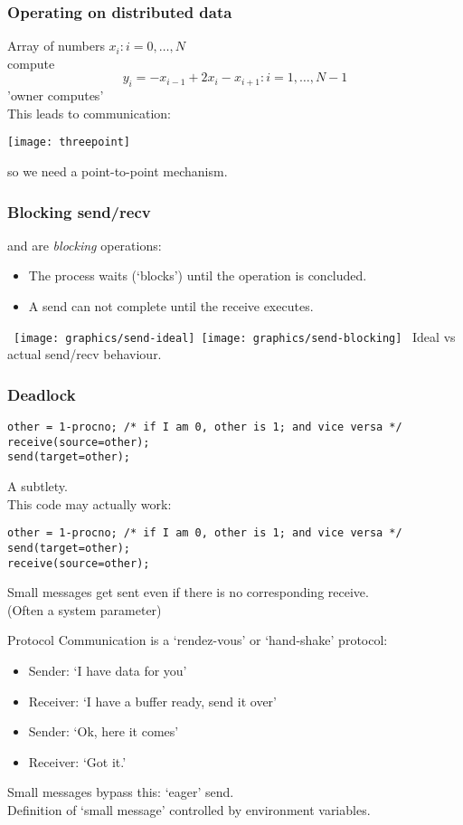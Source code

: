 \begin{frame}[containsverbatim]\frametitle{Operating on distributed data}
Array of numbers $x_i\colon i=0,\ldots,N$\\
compute \[ y_i= -x_{i-1}+2x_i-x_{i+1} \colon i=1,\ldots,N-1 \]
'owner computes'\\
This leads to communication:

\texttt{[image: threepoint]}

so we need a point-to-point mechanism.
\end{frame}


\begin{frame}[containsverbatim]\frametitle{Blocking send/recv}
 and  are \emph{blocking} operations:
\begin{itemize}
\item The process waits (`blocks') until the operation is concluded.
\item A send can not complete until the receive executes.
\end{itemize}
\hbox{
\texttt{[image: graphics/send-ideal]}
\texttt{[image: graphics/send-blocking]}
}
Ideal vs actual send/recv behaviour.
\end{frame}

\begin{frame}[containsverbatim]\frametitle{Deadlock}
\lstset{language=C}
\begin{lstlisting}
other = 1-procno; /* if I am 0, other is 1; and vice versa */
receive(source=other);
send(target=other);
\end{lstlisting}

A subtlety.\\
This code may actually work:
\begin{lstlisting}
other = 1-procno; /* if I am 0, other is 1; and vice versa */
send(target=other);
receive(source=other);
\end{lstlisting}
Small messages get sent even if there is no corresponding receive.\\
(Often a system parameter)
\end{frame}


\begin{frame}{Protocol}
  \label{sl:rendezvous}
Communication is a `rendez-vous' or `hand-shake' protocol:
\begin{itemize}
\item Sender: `I have data for you'
\item Receiver: `I have a buffer ready, send it over'
\item Sender: `Ok, here it comes'
\item Receiver: `Got it.'
\end{itemize}
Small messages bypass this: `eager' send.\\
Definition of `small message' controlled by environment variables.
\end{frame}

